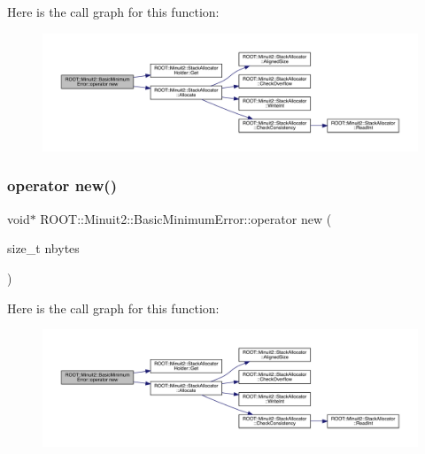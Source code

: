Here is the call graph for this function\+:
\nopagebreak
\begin{figure}[H]
\begin{center}
\leavevmode
\includegraphics[width=350pt]{d9/ddd/classROOT_1_1Minuit2_1_1BasicMinimumError_a722b14848c4cb4144f4ba7cdf90e5ef3_cgraph}
\end{center}
\end{figure}
\mbox{\label{classROOT_1_1Minuit2_1_1BasicMinimumError_a722b14848c4cb4144f4ba7cdf90e5ef3}} 
\subsubsection{\texorpdfstring{operator new()}{operator new()}\hspace{0.1cm}{\footnotesize\ttfamily [3/3]}}
{\footnotesize\ttfamily void$\ast$ R\+O\+O\+T\+::\+Minuit2\+::\+Basic\+Minimum\+Error\+::operator new (\begin{DoxyParamCaption}\item[{size\+\_\+t}]{nbytes }\end{DoxyParamCaption})\hspace{0.3cm}{\ttfamily [inline]}}

Here is the call graph for this function\+:
\nopagebreak
\begin{figure}[H]
\begin{center}
\leavevmode
\includegraphics[width=350pt]{d9/ddd/classROOT_1_1Minuit2_1_1BasicMinimumError_a722b14848c4cb4144f4ba7cdf90e5ef3_cgraph}
\end{center}
\end{figure}
\mbox{\label{classROOT_1_1Minuit2_1_1BasicMinimumError_a83389971838f6e91a3b632604c227571}} 
